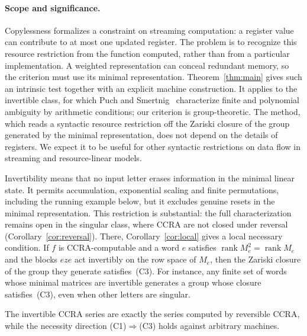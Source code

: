 \documentclass[11pt,letterpaper]{article}
\theoremstyle{definition}
\begin{document}
\paragraph{Scope and significance.}
Copylessness formalizes a constraint on streaming computation: a register value can contribute to at most one updated register. The problem is to recognize this resource restriction from the function computed, rather than from a particular implementation. A weighted representation can conceal redundant memory, so the criterion must use its minimal representation. Theorem~\ref{thm:main} gives such an intrinsic test together with an explicit machine construction. It applies to the invertible class, for which Puch and Smertnig~\cite{PS24} characterize finite and polynomial ambiguity by arithmetic conditions; our criterion is group-theoretic. The method, which reads a syntactic resource restriction off the Zariski closure of the group generated by the minimal representation, does not depend on the details of registers. We expect it to be useful for other syntactic restrictions on data flow in streaming and resource-linear models.

Invertibility means that no input letter erases information in the minimal linear state. It permits accumulation, exponential scaling and finite permutations, including the running example below, but it excludes genuine resets in the minimal representation. This restriction is substantial: the full characterization remains open in the singular class, where CCRA are not closed under reversal (Corollary~\ref{cor:reversal}). There, Corollary~\ref{cor:local} gives a local necessary condition. If $f$ is CCRA-computable and a word $e$ satisfies $\operatorname{rank}M_e^2=\operatorname{rank}M_e$ and the blocks $eze$ act invertibly on the row space of $M_e$, then the Zariski closure of the group they generate satisfies~(C3). For instance, any finite set of words whose minimal matrices are invertible generates a group whose closure satisfies~(C3), even when other letters are singular.

The invertible CCRA series are exactly the series computed by reversible CCRA, while the necessity direction (C1)$\Rightarrow$(C3) holds against arbitrary machines.
\end{document}
